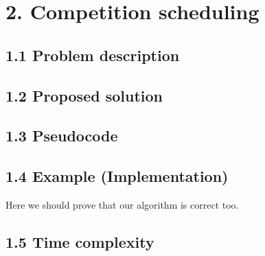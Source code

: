 \documentclass{article}
\begin{document}
\section*{2. Competition scheduling}

\subsection*{1.1 Problem description}

\subsection*{1.2 Proposed solution}

\subsection*{1.3 Pseudocode}

\subsection*{1.4 Example (Implementation)}

Here we should prove that our algorithm is correct too.

\subsection*{1.5 Time complexity}
\end{document}
